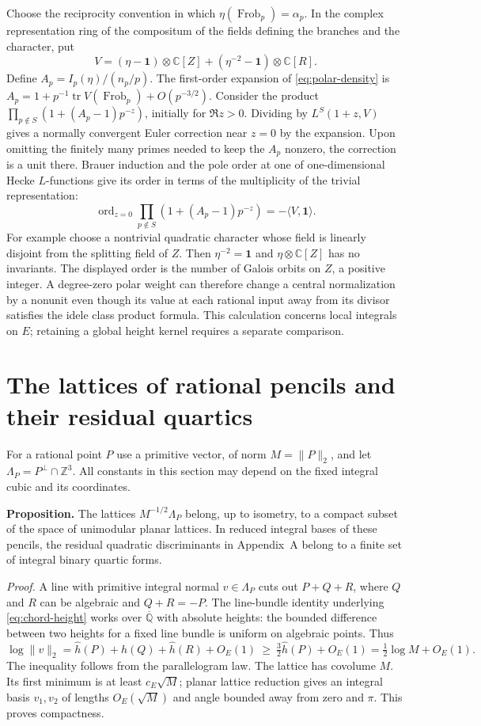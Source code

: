 \documentclass[11pt]{article}
\begin{document}
Choose the reciprocity convention in which $\eta(\operatorname{Frob}_p)
=\alpha_p$. In the complex representation ring of the compositum of
the fields defining the branches and the character, put
\[
 V=(\eta-\mathbf1)\otimes\mathbb C[Z]
       +(\eta^{-2}-\mathbf1)\otimes\mathbb C[R].
\]
Define $A_p=I_p(\eta)/(n_p/p)$. The first-order expansion of
\eqref{eq:polar-density} is
$A_p=1+p^{-1}\operatorname{tr}V(\operatorname{Frob}_p)+O(p^{-3/2})$.
Consider the product $\prod_{p\notin S}(1+(A_p-1)p^{-z})$, initially
for $\Re z>0$. Dividing by $L^S(1+z,V)$ gives a normally convergent
Euler correction near $z=0$ by the expansion. Upon omitting the
finitely many primes needed to keep the $A_p$ nonzero, the correction
is a unit there. Brauer induction and the pole order at one of
one-dimensional Hecke $L$-functions give its order in terms of the
multiplicity of the trivial representation:
\[
 \operatorname{ord}_{z=0}\prod_{p\notin S}
              (1+(A_p-1)p^{-z})=-\langle V,\mathbf1\rangle .
\]
For example choose a nontrivial quadratic character whose field is
linearly disjoint from the splitting field of $Z$.
Then $\eta^{-2}=\mathbf1$ and $\eta\otimes\mathbb C[Z]$ has no
invariants. The displayed order is the number of Galois orbits on $Z$,
a positive integer. A degree-zero polar weight can therefore change
a central normalization by a nonunit even though its value at each
rational input away from its divisor satisfies the idele class product
formula. This calculation concerns local integrals on $E$;
retaining a global height kernel requires a separate comparison.

\section{The lattices of rational pencils and their residual quartics}
\label{app:pencilshape}

For a rational point $P$ use a primitive vector, of norm $M=\|P\|_2$,
and let $\Lambda_P=P^\perp\cap\mathbb Z^3$. All constants in this
section may depend on the fixed integral cubic and its coordinates.

\medskip
\noindent\textbf{Proposition.}
The lattices $M^{-1/2}\Lambda_P$ belong, up to isometry, to a compact
subset of the space of unimodular planar lattices. In reduced integral
bases of these pencils, the residual quadratic discriminants in
Appendix~A belong to a finite set of integral binary quartic forms.

\noindent\emph{Proof.}
A line with primitive integral normal $v\in\Lambda_P$ cuts out
$P+Q+R$, where $Q$ and $R$ can be algebraic and $Q+R=-P$.
The line-bundle identity underlying \eqref{eq:chord-height} works over
$\overline{\mathbb Q}$ with absolute heights: the bounded difference
between two heights for a fixed line bundle is uniform on algebraic
points. Thus
\[
 \log\|v\|_2=\hat h(P)+\hat h(Q)+\hat h(R)+O_E(1)
       \ \ge\ \tfrac32\hat h(P)+O_E(1)
       =\tfrac12\log M+O_E(1).
\]
The inequality follows from the parallelogram law.
The lattice has covolume $M$. Its first minimum is at least $c_E\sqrt M$;
planar lattice reduction gives an integral basis $v_1,v_2$ of lengths
$O_E(\sqrt M)$ and angle bounded away from zero and $\pi$.
This proves compactness.
\end{document}
